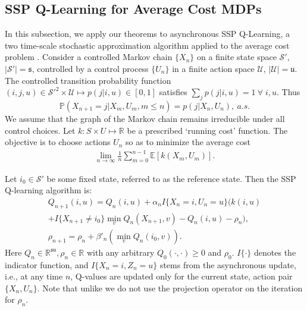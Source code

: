 \documentclass[letterpaper, 10 pt, conference]{ieeeconf}  %
\theoremstyle{definition}
\theoremstyle{plain}
\newcommand{\Scal}{\mathcal{S}}
\newcommand{\UU}{\mathcal{U}}
\newcommand{\sfrak}{\mathfrak{s}}
\newcommand{\ufrak}{\mathfrak{u}}
\newcommand{\RR}{\mathbb{R}}
\newcommand{\PP}{\mathbb{P}}
\begin{document}
\subsection{SSP Q-Learning for Average Cost MDPs}
In this subsection, we apply our theorems to asynchronous SSP Q-Learning, a two time-scale stochastic approximation algorithm applied to the average cost problem \cite{abounadi, bert, tsitsiklis}. Consider a controlled Markov chain $\{X_n\}$ on a finite state space $\Scal'$, $|\Scal'|=\sfrak$, controlled by a control process $\{U_n\}$  in a finite action space $\UU$, $|\UU|=\ufrak$. The controlled transition probability function $(i,j,u) \in \Scal'^2\times \UU\mapsto p(j|i,u) \in [0,1]$ satisfies $\sum_jp(j | i,u) = 1 \ \forall \; i,u.$
Thus
$$\PP(X_{n+1} = j | X_m, U_m, m \leq n) = p(j | X_n, U_n), \ a.s.$$
We assume that the graph of the Markov chain remains irreducible under all control choices. Let $k: S\times U \mapsto \RR$ be a prescribed `running cost' function. The objective is to choose actions $U_n$ so as to minimize the average cost
\begin{align}\label{eq:avg_obj}
    \lim_{n\to\infty}\frac{1}{n}\sum_{m=0}^{n-1}\mathbb{E}[k(X_m,U_m)].
\end{align}

Let $i_0\in\Scal'$ be some fixed state, referred to as the reference state. Then the SSP Q-learning algorithm is:
\begin{subequations}\label{SSP}
    \begin{gather}
        Q_{n+1}(i,u)=Q_n(i,u)+\alpha_n I\{X_n=i,U_n=u\} 
        \Big(k(i,u)\nonumber\\+I\{X_{n+1}\neq i_0\}\min_{v}Q_n(X_{n+1},v)-Q_n(i,u)-\rho_n\Big),\label{SSP-Q}\\
        \rho_{n+1}=\rho_n+\beta'_n(\min_v Q_n(i_0,v)).\label{SSP-lambda}
    \end{gather}
\end{subequations}
Here $Q_n\in\RR^{\sfrak\ufrak}, \rho_n\in\RR$ with any arbitrary $Q_0(\cdot,\cdot)\geq0$ and $\rho_0$. $I\{\cdot\}$ denotes the indicator function, and $I\{X_n=i,Z_n=u\}$ stems from the asynchronous update, i.e., at any time $n$, Q-values are updated only for the current state, action pair $\{X_n,U_n\}$. Note that unlike \cite{bert,abounadi} we do not use the projection operator on the iteration for $\rho_n$. 
\end{document}
